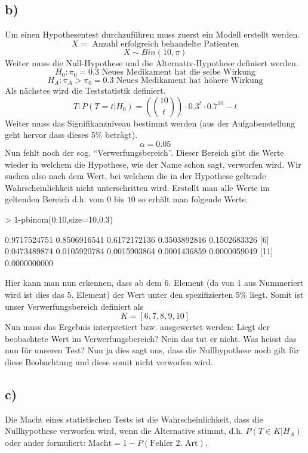 \subsection*{b)}
Um einen Hypothesentest durchzuführen muss zuerst ein Modell erstellt werden.
\[ X = \text{ Anzahl erfolgreich behandelte Patienten}\]
\[ X \sim Bin(10,\pi) \]
Weiter muss die Null-Hypothese
und die Alternativ-Hypothese definiert werden.
\[ H_0: \pi_0 = 0.3 \text{ Neues Medikament hat die selbe Wirkung} \]
\[ H_A: \pi_A > \pi_0 = 0.3 \text{ Neues Medikament hat höhere Wirkung} \]
Als nächstes wird die Teststatistik definiert.
\[ T: P(T=t|H_0)=({10 \choose t}) \cdot 0.3^t \cdot 0.7^10-t \]
Weiter muss das Signifikanzniveau bestimmt werden (aus der Aufgabenstellung
geht hervor dass dieses 5\% beträgt).
\[ \alpha = 0.05 \]
Nun fehlt noch der sog. ``Verwerfungsbereich''. Dieser Bereich gibt die
Werte wieder in welchem die Hypothese, wie der Name schon sagt, verworfen
wird. Wir suchen also nach dem Wert, bei welchem die in der Hypothese geltende
Wahrscheinlichkeit nicht unterschritten wird. Erstellt man alle Werte im
geltenden Bereich d.h. vom $0$ bis $10$ so erhält man folgende Werte.
\begin{Schunk}
\begin{Sinput}
> 1-pbinom(0:10,size=10,0.3)
\end{Sinput}
\begin{Soutput}
 [1] 0.9717524751 0.8506916541 0.6172172136 0.3503892816 0.1502683326
 [6] 0.0473489874 0.0105920784 0.0015903864 0.0001436859 0.0000059049
[11] 0.0000000000
\end{Soutput}
\end{Schunk}
Hier kann man nun erkennen, dass ab dem 6. Element (da von 1 aus Nummeriert
wird ist dies das 5. Element) der Wert unter 
den spezifizierten 5\% liegt. Somit ist unser Verwerfungsbereich definiert als
\[ K = [6,7,8,9,10] \]
Nun muss das Ergebnis interpretiert bzw. ausgewertet werden:
Liegt der beobachtete Wert im Verwerfungsbereich? Nein das tut er nicht.
Was heisst das nun für unseren Test? Nun ja dies sagt uns, dass die
Nullhypothese noch gilt für diese Beobachtung und diese somit nicht
verworfen wird.

\subsection*{c)}
Die Macht eines statistischen Tests ist die Wahrscheinlichkeit, dass
die Nullhypothese verworfen wird, wenn die Alternative stimmt, d.h.
$P(T \in K|H_A)$ oder ander formuliert: 
$\text{Macht}=1-P(\text{Fehler 2. Art})$.

